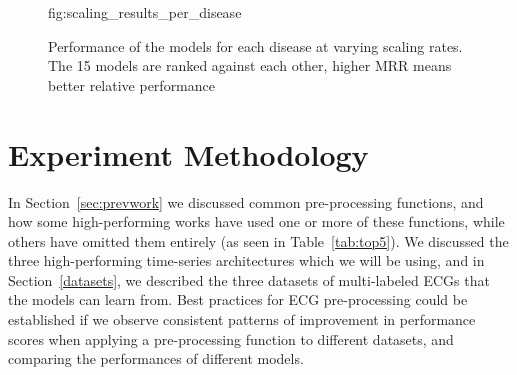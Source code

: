 \documentclass[pmlr,twocolumn]{jmlr}%
\begin{document}
\begin{figure}[!ht]
\floatconts
  {fig:scaling_results_per_disease}
  {\vspace*{-10mm}\caption{Performance of the models for each disease at varying scaling rates. The 15 models are ranked against each other, higher MRR means better relative performance}}
  {
  }\vspace{-7mm}
\end{figure}

\section{Experiment Methodology}
\label{sec:experiment}

In Section~\ref{sec:prevwork} we discussed common pre-processing functions, and how some high-performing works have used one or more of these functions, while others have omitted them entirely (as seen in Table~\ref{tab:top5}). We discussed the three high-performing time-series architectures which we will be using, and in Section~\ref{datasets}, we described the three datasets of multi-labeled ECGs that the models can learn from. Best practices for ECG pre-processing could be established if we observe consistent patterns of improvement in performance scores when applying a pre-processing function to different datasets, and comparing the performances of different models.
\end{document}
